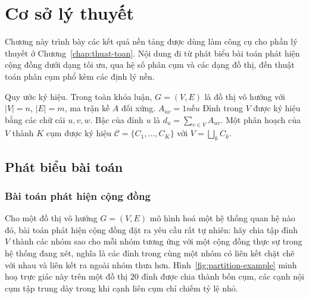 
\chapter{Cơ sở lý thuyết}
\label{chap:co-so}

Chương này trình bày các kết quả nền tảng được dùng làm công cụ cho phần lý thuyết ở Chương~\ref{chap:thuat-toan}. Nội dung đi từ phát biểu bài toán phát hiện cộng đồng dưới dạng tối ưu, qua hệ số phân cụm và các dạng đồ thị, đến thuật toán phân cụm phổ kèm các định lý nền.

Quy ước ký hiệu. Trong toàn khóa luận, $G = (V, E)$ là đồ thị vô hướng với $|V| = n$, $|E| = m$, ma trận kề $A$ đối xứng. $A_{uv} = 1 nếu $ Đỉnh trong $V$ được ký hiệu bằng các chữ cái $u, v, w$. Bậc của đỉnh $u$ là $d_u = \sum_{v \in V} A_{uv}$. Một phân hoạch của $V$ thành $K$ cụm được ký hiệu $\mathcal{C} = \{C_1, \ldots, C_K\}$ với $V = \bigsqcup_k C_k$.

\section{Phát biểu bài toán}
\label{sec:problem}

\subsection{Bài toán phát hiện cộng đồng}
\label{subsec:general-problem}

Cho một đồ thị vô hướng $G = (V, E)$ mô hình hoá một hệ thống quan hệ nào đó, bài toán phát hiện cộng đồng đặt ra yêu cầu rất tự nhiên: hãy chia tập đỉnh $V$ thành các nhóm sao cho mỗi nhóm tương ứng với một cộng đồng thực sự trong hệ thống đang xét, nghĩa là các đỉnh trong cùng một nhóm có liên kết chặt chẽ với nhau và liên kết ra ngoài nhóm thưa hơn. Hình~\ref{fig:partition-example} minh hoạ trực giác này trên một đồ thị $20$ đỉnh được chia thành bốn cụm, các cạnh nội cụm tập trung dày trong khi cạnh liên cụm chỉ chiếm tỷ lệ nhỏ.

